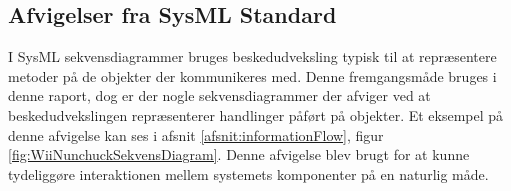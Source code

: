 \subsection{Afvigelser fra SysML Standard}
I SysML sekvensdiagrammer bruges beskedudveksling typisk til at repræsentere metoder på de objekter der kommunikeres med. Denne fremgangsmåde bruges i denne raport, dog er der nogle sekvensdiagrammer der afviger ved at beskedudvekslingen repræsenterer handlinger påført på objekter. Et eksempel på denne afvigelse kan ses i afsnit \ref{afsnit:informationFlow}, figur \ref{fig:WiiNunchuckSekvensDiagram}. Denne afvigelse blev brugt for at kunne tydeliggøre interaktionen mellem systemets komponenter på en naturlig måde.